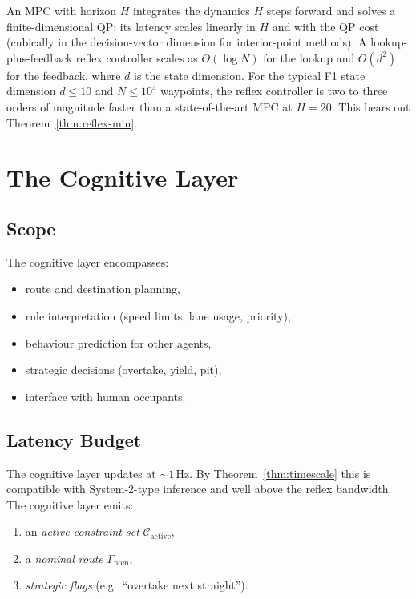 \documentclass[11pt,twocolumn]{article}
\theoremstyle{definition}
\theoremstyle{remark}
\newcommand{\cC}{\mathcal{C}}
\begin{document}
An MPC with horizon $H$ integrates the dynamics $H$ steps forward and solves a finite-dimensional QP; its latency scales linearly in $H$ and with the QP cost (cubically in the decision-vector dimension for interior-point methods). A lookup-plus-feedback reflex controller scales as $O(\log N)$ for the lookup and $O(d^2)$ for the feedback, where $d$ is the state dimension. For the typical F1 state dimension $d \le 10$ and $N \le 10^4$ waypoints, the reflex controller is two to three orders of magnitude faster than a state-of-the-art MPC at $H = 20$. This bears out Theorem~\ref{thm:reflex-min}.

\section{The Cognitive Layer}
\label{sec:cognitive}

\subsection{Scope}

The cognitive layer encompasses:
\begin{itemize}[leftmargin=*,itemsep=2pt]
\item route and destination planning,
\item rule interpretation (speed limits, lane usage, priority),
\item behaviour prediction for other agents,
\item strategic decisions (overtake, yield, pit),
\item interface with human occupants.
\end{itemize}

\subsection{Latency Budget}

The cognitive layer updates at $\sim 1\,\mathrm{Hz}$. By Theorem~\ref{thm:timescale} this is compatible with System-2-type inference and well above the reflex bandwidth. The cognitive layer emits:
\begin{enumerate}[leftmargin=*]
\item an \emph{active-constraint set} $\cC_{\mathrm{active}}$,
\item a \emph{nominal route} $\Gamma_{\mathrm{nom}}$,
\item \emph{strategic flags} (e.g.\ ``overtake next straight'').
\end{enumerate}
\end{document}
